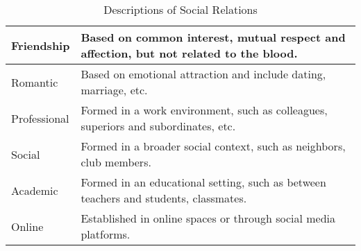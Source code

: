 \begin{itemize}
\begin{table*}[ht]
\begin{tabular}{ll}
      \hline
      Friendship & Based on common interest, mutual respect and affection, but not related to the blood.\\
      \hline
      Romantic & Based on emotional attraction and include dating, marriage, etc.\\
      \hline
      Professional & Formed in a work environment, such as colleagues, superiors and subordinates, etc.\\ 
      \hline
      Social & Formed in a broader social context, such as neighbors, club members.\\
      \hline
      Academic & Formed in an educational setting, such as between teachers and students, classmates.\\
      \hline
      Online & Established in online spaces or through social media platforms.\\
      \hline
    \end{tabular}
    \caption{Descriptions of Social Relations}
    \label{table:social}
    \end{table*}
    

\end{itemize}
